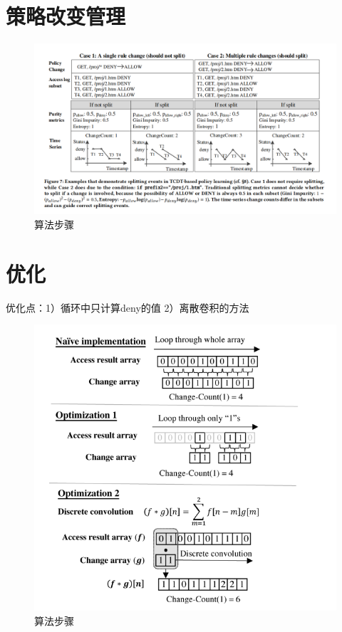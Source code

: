 \documentclass[UTF8]{ctexart}
\begin{document}
	\section{策略改变管理}\label{sec:diliujie}
	\begin{figure}[ht]
        \centering
        \includegraphics[scale=0.5]{picture/005.png}
        \caption{算法步骤}
        \label{fig:005}
    \end{figure}
	\clearpage
	\section{优化}\label{sec:diqijie}
	优化点：1）循环中只计算deny的值   2）离散卷积的方法
	\begin{figure}[ht]
        \centering
        \includegraphics[scale=0.5]{picture/006.png}
        \caption{算法步骤}
        \label{fig:006}
    \end{figure}
	\clearpage
\end{document}
